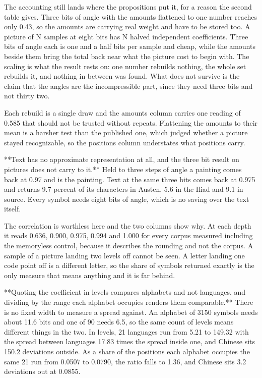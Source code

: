 The accounting still lands where the propositions put it, for a reason the second table gives. Three bits of angle with the amounts flattened to one number reaches only 0.43, so the amounts are carrying real weight and have to be stored too. A picture of N samples at eight bits has N halved independent coefficients. Three bits of angle each is one and a half bits per sample and cheap, while the amounts beside them bring the total back near what the picture cost to begin with. The scaling is what the result rests on: one number rebuilds nothing, the whole set rebuilds it, and nothing in between was found. What does not survive is the claim that the angles are the incompressible part, since they need three bits and not thirty two.

Each rebuild is a single draw and the amounts column carries one reading of 0.585 that should not be trusted without repeats. Flattening the amounts to their mean is a harsher test than the published one, which judged whether a picture stayed recognizable, so the positions column understates what positions carry.

**Text has no approximate representation at all, and the three bit result on pictures does not carry to it.** Held to three steps of angle a painting comes back at 0.97 and is the painting. Text at the same three bits comes back at 0.975 and returns 9.7 percent of its characters in Austen, 5.6 in the Iliad and 9.1 in source. Every symbol needs eight bits of angle, which is no saving over the text itself.

The correlation is worthless here and the two columns show why. At each depth it reads 0.636, 0.900, 0.975, 0.994 and 1.000 for every corpus measured including the memoryless control, because it describes the rounding and not the corpus. A sample of a picture landing two levels off cannot be seen. A letter landing one code point off is a different letter, so the share of symbols returned exactly is the only measure that means anything and it is far behind.

**Quoting the coefficient in levels compares alphabets and not languages, and dividing by the range each alphabet occupies renders them comparable.** There is no fixed width to measure a spread against. An alphabet of 3150 symbols needs about 11.6 bits and one of 90 needs 6.5, so the same count of levels means different things in the two. In levels, 21 languages run from 5.21 to 149.32 with the spread between languages 17.83 times the spread inside one, and Chinese sits 150.2 deviations outside. As a share of the positions each alphabet occupies the same 21 run from 0.0507 to 0.0790, the ratio falls to 1.36, and Chinese sits 3.2 deviations out at 0.0855.

